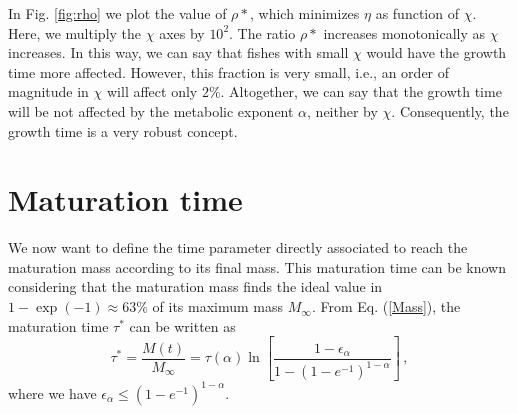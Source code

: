 In Fig. \ref{fig:rho} we plot the value of $\rho*$, which minimizes $\eta$ as function of $\chi$.
Here, we multiply the $\chi$ axes by $10^{2}$.  The ratio $\rho*$ increases monotonically
as $\chi$ increases. In this way, we can say that fishes with small $\chi$ would have the growth
time more affected. However, this fraction is very small, i.e., an order of magnitude in $\chi$ will affect only $2\%$. Altogether, we can say that the growth time will be not affected by the metabolic exponent $\alpha$, neither by $\chi$. Consequently, the growth time is a very robust concept.

\section{Maturation time}

We now want to define the time parameter directly associated to reach the maturation mass according to its final mass. This maturation time can be known considering that the maturation mass finds the ideal value in $1-\exp{(-1)} \approx 63 \% $ of its maximum mass $M_{\infty}$. From Eq. (\ref{Mass}), the maturation time $\tau^*$ can be written as
\begin{equation}
\label{matu}
\tau^* =\frac{M(t)}{M_{\infty}}=\tau(\alpha) \ln{\left[\frac{1-\epsilon_{\alpha}}{1-(1-e^{-1})^{1-\alpha}}\right]}\,,
\end{equation}
where we have $\epsilon_{\alpha} \leq (1-e^{-1})^{1-\alpha}$.



